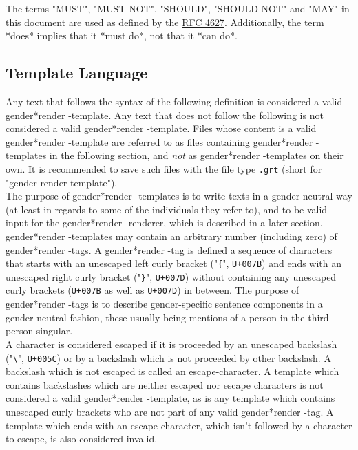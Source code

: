 \documentclass{article}
\newcommand{\GenderRender}{
    gender*render
}
\begin{document}
    The terms "MUST", "MUST NOT", "SHOULD", "SHOULD NOT" and "MAY" in this document are used as defined by the \href{https://tools.ietf.org/html/rfc2119}{RFC 4627}.
    Additionally, the term *does* implies that it *must do*, not that it *can do*.

    \subsection{Template Language}

    Any text that follows the syntax of the following definition is considered a valid \GenderRender-template.
    Any text that does not follow the following is not considered a valid \GenderRender-template.
    Files whose content is a valid \GenderRender-template are referred to as files containing \GenderRender-templates in the following section, and \emph{not} as \GenderRender-templates on their own.
    It is recommended to save such files with the file type \texttt{.grt} (short for "gender render template").\\

    The purpose of \GenderRender-templates is to write texts in a gender-neutral way (at least in regards to some of the individuals they refer to), and to be valid input for the \GenderRender-renderer, which is described in a later section.\\

    \GenderRender-templates may contain an arbitrary number (including zero) of \GenderRender-tags.
    A \GenderRender-tag is defined a sequence of characters that starts with an unescaped left curly bracket ("\texttt{\{}", \texttt{U+007B}) and ends with an unescaped right curly bracket ("\texttt{\}}", \texttt{U+007D}) without containing any unescaped curly brackets (\texttt{U+007B} as well as \texttt{U+007D}) in between.
    The purpose of \GenderRender-tags is to describe gender-specific sentence components in a gender-neutral fashion, these usually being mentions of a person in the third person singular.\\

    A character is considered escaped if it is proceeded by an unescaped backslash ("\texttt{\textbackslash}", \texttt{U+005C}) or by a backslash which is not proceeded by other backslash.
    A backslash which is not escaped is called an escape-character.
    A template which contains backslashes which are neither escaped nor escape characters is not considered a valid \GenderRender-template, as is any template which contains unescaped curly brackets who are not part of any valid \GenderRender-tag.
    A template which ends with an escape character, which isn't followed by a character to escape, is also considered invalid.\\
\end{document}
